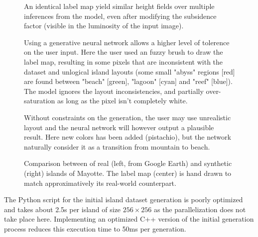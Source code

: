 \begin{figure}
    \caption{An identical label map yield similar height fields over multiple inferences from the model, even after modifying the subsidence factor (visible in the luminosity of the input image).}
    \label{fig:coral-island_results-subsidence}
\end{figure}
\begin{figure}
    \caption{Using a generative neural network allows a higher level of tolerence on the user input. Here the user used an fuzzy brush to draw the label map, resulting in some pixels that are inconsistent with the dataset and unlogical island layouts (some small "abyss" regions [red] are found between "beach" [green], "lagoon" [cyan] and "reef" [blue]). The model ignores the layout inconsistencies, and partially over-saturation as long as the pixel isn't completely white. }
    \label{fig:coral-island_results-fuzzy}
\end{figure}
\begin{figure}
    \caption{Without constraints on the generation, the user may use unrealistic layout and the neural network will however output a plausible result. Here new colors has been added (pistachio), but the network naturally consider it as a transition from mountain to beach. }
    \label{fig:coral-island_results_dino}
\end{figure}
\begin{figure}
    \caption{Comparison between of real (left, from Google Earth) and synthetic (right) islands of Mayotte. The label map (center) is hand drawn to match approximatively its real-world counterpart. }
    \label{fig:coral-island_example-Mayotte}
\end{figure}



The Python script for the initial island dataset generation is poorly optimized and takes about 2.5s per island of size $256 \times 256$ as the parallelization does not take place here. Implementing an optimized C++ version of the initial generation process reduces this execution time to 50ms per generation.

